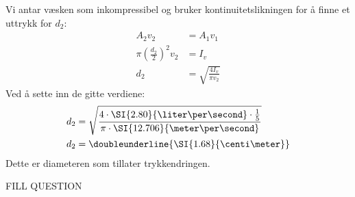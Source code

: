\documentclass[answers,a4paper,12pt]{exam}
\begin{document}
\begin{questions}
\begin{parts}
\begin{solution}
Vi antar væsken som inkompressibel og bruker kontinuitetslikningen for å finne et uttrykk for $d_2$:
\begin{align}
A_2 v_2 &= A_1 v_1 \\
\pi \left(\frac{d_2}{2}\right)^2 v_2 &= I_v \\
d_2 &= \sqrt{\frac{4 I_v}{\pi v_2}}
\end{align}
Ved å sette inn de gitte verdiene:
\begin{align}
d_2 &= \sqrt{\frac{4 \cdot \SI{2.80}{\liter\per\second} \cdot \frac{1}{5}}{\pi \cdot \SI{12.706}{\meter\per\second}}} \\
d_2 &= \doubleunderline{\SI{1.68}{\centi\meter}}
\end{align}
Dette er diameteren som tillater trykkendringen.
\end{solution}

\end{parts}



\question FILL QUESTION
\end{questions}
\end{document}
